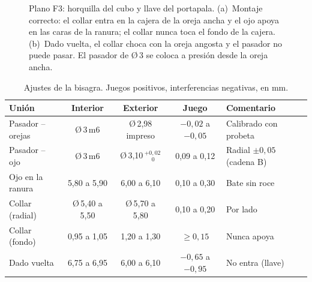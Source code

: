 \begin{figure}[H]
\vspace{2mm}
\caption{Plano F3: horquilla del cubo y llave del portapala. (a)~Montaje correcto: el collar
entra en la cajera de la oreja ancha y el ojo apoya en las caras de la ranura; el collar
nunca toca el fondo de la cajera. (b)~Dado vuelta, el collar choca con la oreja angosta
y el pasador no puede pasar. El pasador de Ø\,3 se coloca a presión desde la oreja ancha.}
\label{fig:fabricacion-llave}
\end{figure}

\begin{table}[H]
\centering\small
\caption{Ajustes de la bisagra. Juegos positivos, interferencias negativas, en mm.}
\label{tab:fabricacion-ajustes-bisagra}
\begin{tabularx}{\textwidth}{@{}lcccY@{}}
\toprule
\textbf{Unión} & \textbf{Interior} & \textbf{Exterior} & \textbf{Juego} & \textbf{Comentario}\\\midrule
Pasador -- orejas & Ø\,3\,m6 & Ø\,2,98 impreso & $-0{,}02$ a $-0{,}05$ & Calibrado con probeta\\
Pasador -- ojo & Ø\,3\,m6 & Ø\,3,10\,$^{+0{,}02}_{\phantom{+}0}$ & 0,09 a 0,12 & Radial $\pm0{,}05$ (cadena B)\\
Ojo en la ranura & 5,80 a 5,90 & 6,00 a 6,10 & 0,10 a 0,30 & Bate sin roce\\
Collar (radial) & Ø\,5,40 a 5,50 & Ø\,5,70 a 5,80 & 0,10 a 0,20 & Por lado\\
Collar (fondo) & 0,95 a 1,05 & 1,20 a 1,30 & $\ge0{,}15$ & Nunca apoya\\
Dado vuelta & 6,75 a 6,95 & 6,00 a 6,10 & $-0{,}65$ a $-0{,}95$ & No entra (llave)\\
\bottomrule
\end{tabularx}
\end{table}

